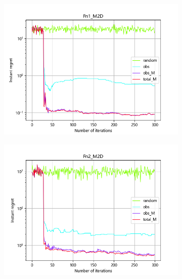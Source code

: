 \documentclass{article}
\begin{document}
\begin{figure}[H]
    \centering
    \begin{subfigure}[t]{.32\linewidth}
        \centering
        \includegraphics[width=1\textwidth]{pictures/Homo_noise_2D/M/Fn1_M2D_ins.png}
    \end{subfigure}
    \begin{subfigure}[t]{.32\linewidth}
        \centering
        \includegraphics[width=1\textwidth]{pictures/Homo_noise_2D/M/Fn2_M2D_ins.png}
    \end{subfigure}
    \begin{subfigure}[t]{.32\linewidth}
        \centering

\end{subfigure}
\end{figure}
\end{document}
